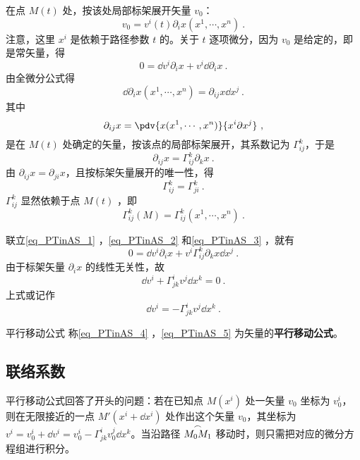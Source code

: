 在点 $M(t)$ 处，按该处局部标架展开矢量 $v_0$：
\begin{equation}
v_0=v^i(t)\partial_i x(x^1,\cdots,x^n)~.
\end{equation}
注意，这里 $x^i$ 是依赖于路径参数 $t$ 的。关于 $t$ 逐项微分，因为 $v_0$ 是给定的，即是常矢量，得
\begin{equation}\label{eq_PTinAS_1}
0=\dd v^i\partial_i x+v^i\dd \partial_i x~.
\end{equation}
由全微分公式得
\begin{equation}\label{eq_PTinAS_2}
\dd \partial_i x(x^1,\cdots,x^n)=\partial_{ij}x\dd x^j~.
\end{equation}
其中
\begin{equation}
\partial_{ij}x=\pdv{x(x^1,\cdots,x^n)}{x^i\partial x^j}~,
\end{equation}
是在 $M(t)$ 处确定的矢量，按该点的局部标架展开，其系数记为 $\Gamma^k_{ij}$，于是
\begin{equation}\label{eq_PTinAS_3}
\partial_{ij}x=\Gamma^k_{ij}\partial_k x~.
\end{equation}
由 $\partial_{ij} x=\partial_{ji} x$，且按标架矢量展开的唯一性，得
\begin{equation}
\Gamma^k_{ij}=\Gamma^k_{ji}~.
\end{equation}
 $\Gamma^k_{ij}$ 显然依赖于点 $M(t)$ ，即
 \begin{equation}
 \Gamma^k_{ij}(M)=\Gamma^k_{ij}(x^1,\cdots,x^n)~.
 \end{equation}
 
联立\autoref{eq_PTinAS_1} ，\autoref{eq_PTinAS_2} 和\autoref{eq_PTinAS_3} ，就有
\begin{equation}
0=\dd v^i\partial_i x+v^i\Gamma^k_{ij}\partial_k x\dd x^j~.
\end{equation}
由于标架矢量 $\partial_i x$ 的线性无关性，故
\begin{equation}\label{eq_PTinAS_4}
\dd v^i+\Gamma^i_{jk}v^j\dd x^k=0~.
\end{equation}
上式或记作
\begin{equation}\label{eq_PTinAS_5}
\dd v^i=-\Gamma^i_{jk}v^j\dd x^k~.
\end{equation}
\begin{definition}{平行移动公式}
称\autoref{eq_PTinAS_4} ，\autoref{eq_PTinAS_5} 为矢量的\textbf{平行移动公式}。
\end{definition}

\subsection{联络系数}
平行移动公式回答了开头的问题：若在已知点 $M(x^i)$ 处一矢量 $v_0$ 坐标为 $v_0^i$，则在无限接近的一点 $M'(x^i+\dd x^i)$ 处作出这个矢量 $v_0$，其坐标为 $v^i=v_0^i+\dd v^i=v_0^i-\Gamma^i_{jk}v_0^j\dd x^k$。当沿路径 $\overset{\Huge\frown}{M_0M_1}$ 移动时，则只需把对应的微分方程组进行积分。

